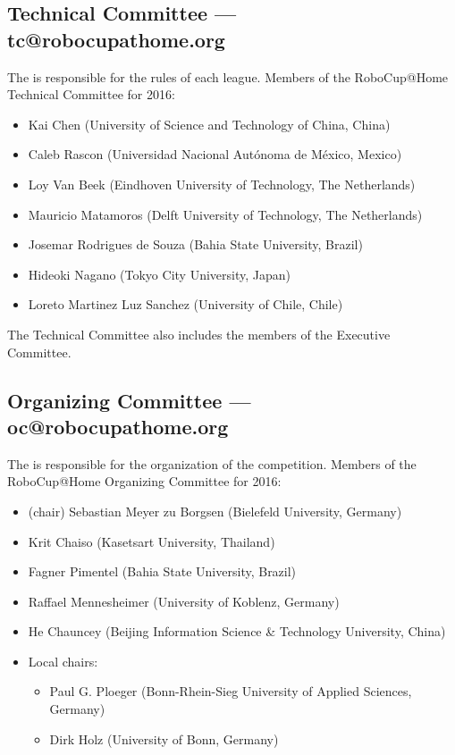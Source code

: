 \subsection{Technical Committee --- tc@robocupathome.org}
\label{sec:tc}
The  is responsible for the rules of each league. Members of the RoboCup@Home Technical Committee for 2016:
\begin{itemize}
\item Kai Chen (University of Science and Technology of China, China)
\item Caleb Rascon (Universidad Nacional Aut{\'o}noma de M{\'e}xico, Mexico)
\item Loy Van Beek (Eindhoven University of Technology, The Netherlands)
\item Mauricio Matamoros  (Delft University of Technology, The Netherlands)
\item Josemar Rodrigues de Souza (Bahia State University, Brazil)
\item Hideoki Nagano (Tokyo City University, Japan)
\item Loreto Martinez Luz Sanchez (University of Chile, Chile)
\end{itemize}
The Technical Committee also includes the members of the Executive Committee.

\subsection{Organizing Committee --- oc@robocupathome.org}
\label{sec:oc}
The  is responsible for the organization of the competition. Members of the RoboCup@Home Organizing Committee for 2016:

\begin{itemize}
\item (chair) Sebastian Meyer zu Borgsen (Bielefeld University, Germany)
\item Krit Chaiso (Kasetsart University, Thailand)
\item Fagner Pimentel (Bahia State University, Brazil)
\item Raffael Mennesheimer (University of Koblenz, Germany)
\item He Chauncey (Beijing Information Science \& Technology University, China)
\item Local chairs:
  \begin{itemize}
    \item Paul G. Ploeger (Bonn-Rhein-Sieg University of Applied Sciences, Germany) 
    \item Dirk Holz (University of Bonn, Germany)
  \end{itemize}
\end{itemize}

